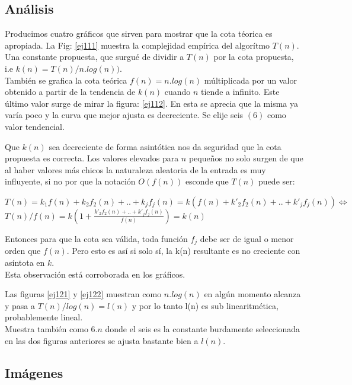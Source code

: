 \documentclass[11pt,a4paper]{article}
\newcommand{\sisosi}{\Leftrightarrow}
\newcommand{\bc}{\begin{center}}
\newcommand{\ec}{\end{center}}
\begin{document}
\subsection*{Análisis}

Producimos cuatro gráficos que sirven para mostrar que la cota téorica es apropiada.
La Fig: \ref{ej111} muestra la complejidad empírica del algorítmo $T(n)$. 
Una constante propuesta, que surgué de dividir a $T(n)$ por la cota propuesta, i.e $k(n) = T(n) / n.log(n) ) $. \\
También se grafica la cota teórica $f(n) = n.log(n)$ múltiplicada por un valor obtenido a partir de la tendencia de $k(n)$ cuando $n$ tiende a infinito. 
Este último valor surge de mirar la figura: \ref{ej112}.
En esta se aprecia que la misma ya varía poco y la curva que mejor ajusta es decreciente. 
Se elije seis $(6)$ como valor tendencial.

Que $k(n)$ sea decreciente de forma asintótica nos da seguridad que la cota propuesta es correcta. Los valores elevados para $n$ pequeños no solo surgen de que al haber valores más chicos la naturaleza aleatoria de la entrada es muy influyente, si no por que la notación $O(f(n))$ esconde que $T(n)$ puede ser:

\bc
$T(n) = k_1f(n) + k_2 f_2(n) + .. + k_j f_j(n) = k( f(n) + k'_2f_2(n) + .. + k'_jf_j(n)) \sisosi$\\
$T(n) / f(n) = k ( 1 + \frac{k'_2f_2(n) + .. + k'_jf_j(n)}{f(n)}) = k(n)$ 
\ec

Entonces para que la cota sea válida, toda función $f_j$ debe ser de igual o menor orden que $f(n)$. Pero esto es así si solo sí, la k(n) resultante es no creciente con asíntota en $k$. \\
Esta observación está corroborada en los gráficos.

Las figuras \ref{ej121} y \ref{ej122} muestran como $n.log(n)$ en algún momento alcanza y pasa a $T(n) / log(n) = l(n)$ y por lo tanto l(n) es sub linearitmética, probablemente lineal. \\
Muestra también como $6.n$ donde el seis es la constante burdamente seleccionada en las dos figuras anteriores se ajusta bastante bien a $l(n)$.


\subsection*{Imágenes}
\end{document}
